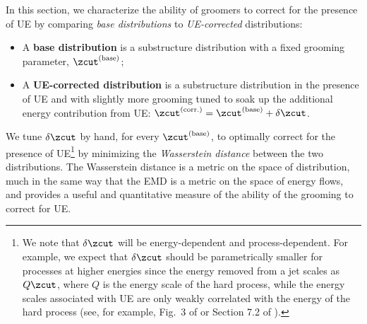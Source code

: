 In this section, we characterize the ability of groomers to correct for the presence of UE by comparing \textit{base distributions} to \textit{UE-corrected} distributions:
\begin{itemize}
    \item
    A \textbf{base distribution} is a substructure distribution with a fixed grooming parameter, \(\zcut^{(\rm base)}\);

    \item
    A \textbf{UE-corrected distribution} is a substructure distribution in the presence of UE and with slightly more grooming tuned to soak up the additional energy contribution from UE:
    \(\zcut^{(\rm corr.)} = \zcut^{(\rm base)} + \delta\zcut\).
\end{itemize}
We tune \(\delta \zcut\) by hand, for every \(\zcut^{(\rm base)}\), to optimally correct for the presence of UE\footnote{
We note that \(\delta\zcut\) will be energy-dependent and process-dependent.
%
For example, we expect that \(\delta\zcut\) should be parametrically smaller for processes at higher energies since the energy removed from a jet scales as \(Q \zcut\), where \(Q\) is the energy scale of the hard process, while the energy scales associated with UE are only weakly correlated with the energy of the hard process (see, for example, Fig.~3 of  or Section 7.2 of ).
} by minimizing the \textit{Wasserstein distance} between the two distributions.
%
The Wasserstein distance is a metric on the space of distribution, much in the same way that the EMD is a metric on the space of energy flows, and provides a useful and quantitative measure of the ability of the grooming to correct for UE.



